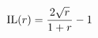 \documentclass[preview]{standalone}
\begin{document}
\begin{align*}
\special{dvisvgm:raw <g id='unique000'>}\text{IL}(r) = \frac{2\sqrt{r}}{1+r} - 1\special{dvisvgm:raw </g>}
\end{align*}
\end{document}

